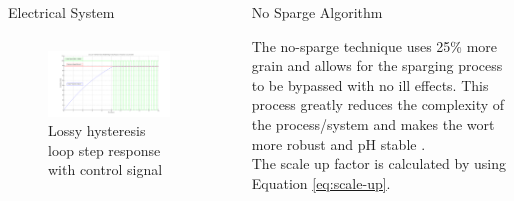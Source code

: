 \documentclass[final]{beamer}
\newlength{\sepwid}
\newlength{\onecolwid}
\newlength{\twocolwid}
\begin{document}
\begin{frame}[t]
\begin{columns}[t]
\begin{column}{\twocolwid}
\begin{block}{Electrical System}
\begin{columns}[t,totalwidth=\twocolwid]
\begin{column}{\onecolwid}
\begin{justify}
\begin{figure}
\includegraphics[width=\linewidth]{hysteresis-step-lossy.png}
\caption{Lossy hysteresis loop step response with control signal}
\end{figure}
\end{justify}

\end{column} %

\end{columns} %

\end{block}


\end{column} %

\begin{column}{\sepwid}\end{column} %

\begin{column}{\onecolwid} %


\begin{block}{No Sparge Algorithm}

The no-sparge technique uses 25\% more grain and allows for the sparging process to be bypassed with no ill effects.  This process greatly reduces the complexity of the process/system and makes the wort more robust and pH stable \cite{sparging}. \\

\noindent The scale up factor is calculated by using Equation \ref{eq:scale-up}.


\end{block}
\end{column}
\end{columns}
\end{frame}
\end{document}
